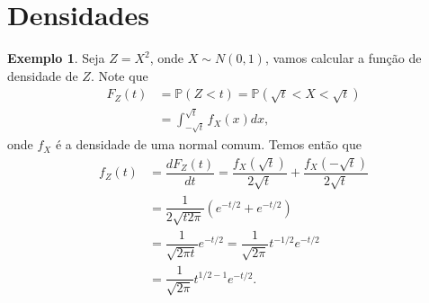 \documentclass[12pt,a4paper,oneside]{book}
\newtheorem{theorem}{Teorema}[section]
\theoremstyle{definition}
\newtheorem{example}[theorem]{Exemplo}
\theoremstyle{remark}
\numberwithin{equation}{section}
\newcommand{\R}{\mathbb{R}}
\newcommand{\pr}{\mathbb{P}}
\begin{document}

\newpage



\section{Densidades}





\begin{tcolorbox}
\begin{example} \label{chi-sqrd} Seja $Z = X^2$, onde $X\sim N(0,1)$, vamos calcular a função de densidade de $Z$. Note que
\begin{align*}
F_Z(t) &= \pr(Z<t) = \pr(\sqrt{t}<X<\sqrt{t}) \\
	&=\int_{-\sqrt{t}}^{\sqrt{t}} f_X(x)dx,
\end{align*}
onde $f_X$ é a densidade de uma normal comum. Temos então que
\begin{align*}
f_Z(t)  &=\dfrac{dF_Z(t)}{dt} = \dfrac{f_X(\sqrt{t})}{2\sqrt{t}}+\dfrac{f_X(-\sqrt{t})}{2\sqrt{t}} \\  
	&= \dfrac{1}{2\sqrt{t 2\pi}}\left(e^{-t/2} + e^{-t/2}    \right)\\
	&= \dfrac{1}{\sqrt{ 2\pi t}}e^{-t/2} = \dfrac{1}{\sqrt{2\pi}}t^{-1/2}e^{-t/2}\\
	&= \dfrac{1}{\sqrt{2\pi}}t^{1/2-1}e^{-t/2}.\\
\end{align*}

\end{example}
\end{tcolorbox}
\end{document}
